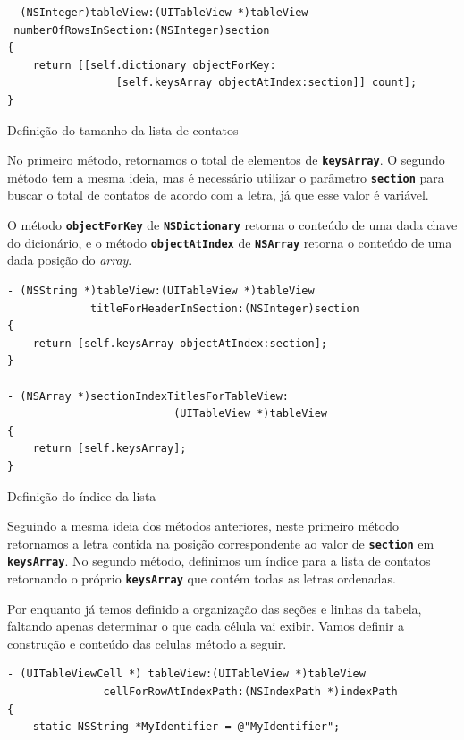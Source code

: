 \documentclass[a4paper,12pt,brazil,doubleside]{book}
\begin{document}
\begin{singlespace}
\begin{listing}[H]
\begin{verbatim}
- (NSInteger)tableView:(UITableView *)tableView
 numberOfRowsInSection:(NSInteger)section
{
    return [[self.dictionary objectForKey:
                 [self.keysArray objectAtIndex:section]] count];
}
\end{verbatim}
\caption{Definição do tamanho da lista de contatos}
\end{listing}


No primeiro método, retornamos o total de elementos de \texttt{\textbf{keysArray}}. O segundo método tem a mesma ideia, mas é necessário utilizar o parâmetro \texttt{\textbf{section}} para buscar o total de contatos de acordo com a letra, já que esse valor é variável.

O método \texttt{\textbf{objectForKey}} de \texttt{\textbf{NSDictionary}} retorna o conteúdo de uma dada chave do dicionário, e o método \texttt{\textbf{objectAtIndex}} de \texttt{\textbf{NSArray}} retorna o conteúdo de uma dada posição do \emph{array}.

\begin{listing}[H]
\begin{verbatim}
- (NSString *)tableView:(UITableView *)tableView
             titleForHeaderInSection:(NSInteger)section
{
    return [self.keysArray objectAtIndex:section];
}

- (NSArray *)sectionIndexTitlesForTableView:
                          (UITableView *)tableView
{    
    return [self.keysArray];
}
\end{verbatim}
\caption{Definição do índice da lista}
\end{listing}


Seguindo a mesma ideia dos métodos anteriores, neste primeiro método retornamos a letra contida na posição correspondente ao valor de \texttt{\textbf{section}} em \texttt{\textbf{keysArray}}. No segundo método, definimos um índice para a lista de contatos retornando o próprio \texttt{\textbf{keysArray}} que contém todas as letras ordenadas.

Por enquanto já temos definido a organização das seções e linhas da tabela, faltando apenas determinar o que cada célula vai exibir. Vamos definir a construção e conteúdo das celulas método a seguir.

\begin{listing}[H]
\begin{verbatim}
- (UITableViewCell *) tableView:(UITableView *)tableView
               cellForRowAtIndexPath:(NSIndexPath *)indexPath
{
    static NSString *MyIdentifier = @"MyIdentifier";
    

\end{verbatim}
\end{listing}
\end{singlespace}
\end{document}
